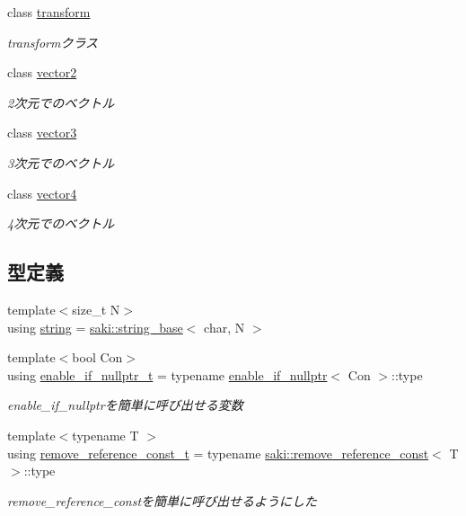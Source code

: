 \begin{DoxyCompactItemize}
class \mbox{\hyperlink{classsaki_1_1transform}{transform}}
\begin{DoxyCompactList}\small\item\em transformクラス \end{DoxyCompactList}\item 
class \mbox{\hyperlink{classsaki_1_1vector2}{vector2}}
\begin{DoxyCompactList}\small\item\em 2次元でのベクトル \end{DoxyCompactList}\item 
class \mbox{\hyperlink{classsaki_1_1vector3}{vector3}}
\begin{DoxyCompactList}\small\item\em 3次元でのベクトル \end{DoxyCompactList}\item 
class \mbox{\hyperlink{classsaki_1_1vector4}{vector4}}
\begin{DoxyCompactList}\small\item\em 4次元でのベクトル \end{DoxyCompactList}\end{DoxyCompactItemize}
\subsection*{型定義}
\begin{DoxyCompactItemize}
\item 
{\footnotesize template$<$size\+\_\+t N$>$ }\\using \mbox{\hyperlink{namespacesaki_a47847d63f1d9c97ca37f33eeecb27674}{string}} = \mbox{\hyperlink{classsaki_1_1string__base}{saki\+::string\+\_\+base}}$<$ char, N $>$
\item 
{\footnotesize template$<$bool Con$>$ }\\using \mbox{\hyperlink{namespacesaki_a4c362f5119aac94085eab0bf794facf7}{enable\+\_\+if\+\_\+nullptr\+\_\+t}} = typename \mbox{\hyperlink{structsaki_1_1enable__if__nullptr}{enable\+\_\+if\+\_\+nullptr}}$<$ Con $>$\+::type
\begin{DoxyCompactList}\small\item\em enable\+\_\+if\+\_\+nullptrを簡単に呼び出せる変数 \end{DoxyCompactList}\item 
{\footnotesize template$<$typename T $>$ }\\using \mbox{\hyperlink{namespacesaki_aff6964622fdfcdf489dab4b87727a8e4}{remove\+\_\+reference\+\_\+const\+\_\+t}} = typename \mbox{\hyperlink{structsaki_1_1remove__reference__const}{saki\+::remove\+\_\+reference\+\_\+const}}$<$ T $>$\+::type
\begin{DoxyCompactList}\small\item\em remove\+\_\+reference\+\_\+constを簡単に呼び出せるようにした \end{DoxyCompactList}\end{DoxyCompactItemize}
